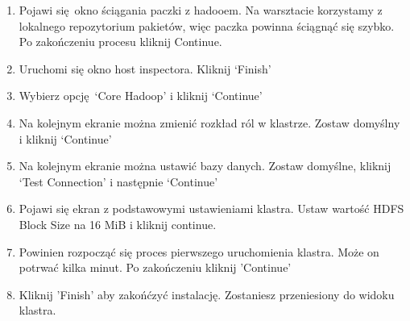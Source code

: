\documentclass[11pt]{article}
\begin{document}
\begin{enumerate}
\item Pojawi się okno ściągania paczki z hadooem. Na warsztacie korzystamy z lokalnego repozytorium pakietów, więc paczka powinna ściągnąć się szybko. Po zakończeniu procesu kliknij Continue.
\item Uruchomi się okno host inspectora. Kliknij ‘Finish’
\item Wybierz opcję ‘Core Hadoop’ i kliknij ‘Continue’
\item Na kolejnym ekranie można zmienić rozkład ról w klastrze. Zostaw domyślny i kliknij ‘Continue’
\item Na kolejnym ekranie można ustawić bazy danych. Zostaw domyślne, kliknij ‘Test Connection’ i następnie ‘Continue’
\item Pojawi się ekran z podstawowymi ustawieniami klastra. Ustaw wartość HDFS Block Size  na 16 MiB i kliknij continue.
\item Powinien rozpocząć się proces pierwszego uruchomienia klastra. Może on potrwać kilka minut. Po zakończeniu kliknij 'Continue'
\item Kliknij 'Finish' aby zakońćzyć instalację. Zostaniesz przeniesiony do widoku klastra.
\end{enumerate}
\end{document}
